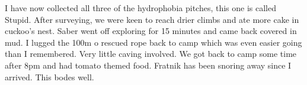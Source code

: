 I have now collected all three of the hydrophobia pitches, this one is called Stupid. After surveying, we were keen to reach drier climbs and ate more cake in cuckoo’s nest. Saber went off exploring for 15 minutes and came back covered in mud. I lugged the 100m o rescued rope back to camp which was even easier going than I remembered. Very little caving involved. We got back to camp some time after 8pm and had tomato themed food. Fratnik has been snoring away since I arrived. This bodes well.



